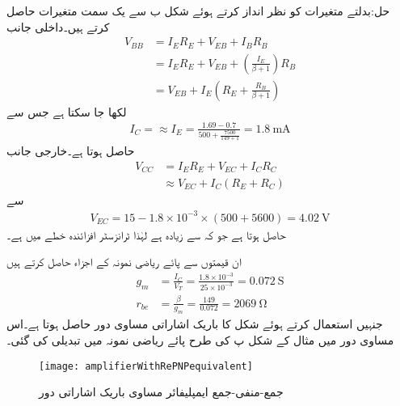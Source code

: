 حل:بدلتے متغیرات کو نظر انداز کرتے ہوئے شکل  ب سے یک سمت متغیرات حاصل کرتے ہیں۔داخلی جانب 
\begin{align*}
V_{BB}&=I_E R_E+V_{EB}+I_B R_B\\
&=I_E R_E +V_{EB}+\left(\frac{I_E}{\beta+1}\right) R_B\\
&=V_{EB}+I_E \left(R_E+\frac{R_B}{\beta+1} \right)
\end{align*}
لکھا جا سکتا ہے جس سے
\begin{align*}
I_C= \approx I_E =\frac{1.69-0.7}{500+\frac{7500}{149+1}}=\SI{1.8}{\milli \ampere}
\end{align*}
حاصل ہوتا ہے۔خارجی جانب
\begin{align*}
V_{CC}&=I_E R_E +V_{EC}+I_C R_C \\
& \approx V_{EC}+I_C \left(R_E+R_C \right)
\end{align*}
سے
\begin{align*}
V_{EC}=15 -1.8 \times 10^{-3} \times \left(500+5600 \right)=\SI{4.02}{\volt}
\end{align*}
حاصل ہوتا ہے جو کہ  سے زیادہ ہے لہٰذا ٹرانزسٹر افزائندہ خطے میں ہے۔

ان قیمتوں سے پائے ریاضی نمونہ  کے اجزاء حاصل کرتے ہیں
\begin{align*}
g_m&=\frac{I_C}{V_T}=\frac{1.8 \times 10^{-3}}{25 \times 10^{-3}}=\SI{0.072}{\siemens}\\
r_{be}&=\frac{\beta}{g_m}=\frac{149}{0.072}=\SI{2069}{\ohm}
\end{align*}
جنہیں استعمال کرتے ہوئے شکل  کا باریک اشاراتی مساوی دور حاصل ہوتا ہے۔اس مساوی دور میں مثال  کے شکل  پ کی طرح پائے ریاضی نمونہ  میں تبدیلی کی گئی۔ 
\begin{figure}
\centering
\texttt{[image: amplifierWithRePNPequivalent]}
\caption{جمع-منفی-جمع ایمپلیفائر مساوی باریک اشاراتی دور}
\label{شکل_ٹرانزسٹر_جمع_منفی_جمع_امپلیفائر_مساوی}
\end{figure}

